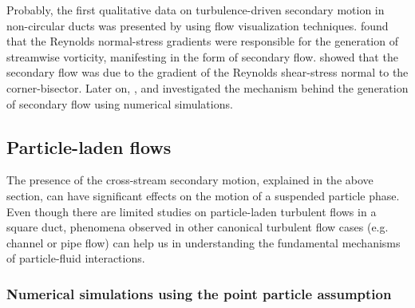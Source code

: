 \documentclass{jfm}
\begin{document}
Probably, the first qualitative data on turbulence-driven secondary motion in non-circular ducts was presented by \citet{nikuradse1930untersuchungen} using flow visualization techniques. \citet{brundrett1964production} found that the Reynolds normal-stress gradients were responsible for the generation of streamwise vorticity, manifesting in the form of secondary flow. \citet{gessner1973origin} showed that the secondary flow was due to the gradient of the Reynolds shear-stress normal to the corner-bisector. Later on, \citet{gavrilakis1992numerical}, \citet{huser1993direct} and \citet{uhlmann2007marginally} investigated the mechanism behind the generation of secondary flow using numerical simulations.

\subsection{Particle-laden flows}\label{sec:Effect of particles}

The presence of the cross-stream secondary motion, explained in the above section, can have significant effects on the motion of a suspended particle phase. Even though there are limited studies on particle-laden turbulent flows in a square duct, phenomena observed in other canonical turbulent flow cases (e.g. channel or pipe flow) can help us in understanding the fundamental mechanisms of particle-fluid interactions. 

\subsubsection{Numerical simulations using the point particle assumption}\label{subsec:Numerical simulations using the point particle assumption}
\end{document}
